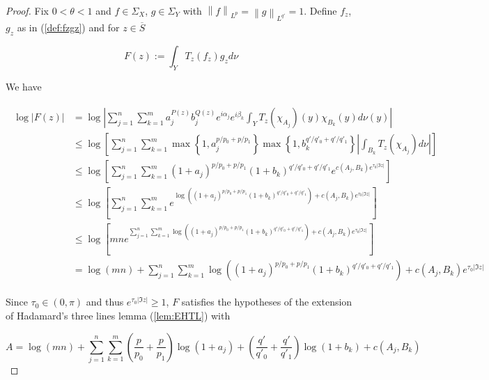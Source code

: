 \begin{proof}
	Fix $0 < \theta < 1$ and $f \in \Sigma_X$, $g \in \Sigma_Y$ with $\left\|f\right\|_{L^p} = \left\|g\right\|_{L^{q'}} = 1$. Define $f_z$, $g_z$ as in (\ref{def:fzgz}) and for $z \in \overline{S}$

	\begin{equation}
		F(z) := \int_Y T_z(f_z)g_z d\nu	
	\end{equation}

	We have

	\begin{gather*}
		\begin{aligned}
			\log \left| F(z) \right| &= \log \left| \sum_{j = 1}^n\sum_{k = 1}^m a^{P(z)}_j b_j^{Q(z)} e^{i\alpha_j} e^{i\beta_k} \int_YT_z(\chi_{A_j})(y)\chi_{B_k}(y)d\nu(y)\right|\\
			&\leqslant  \log \left[ \sum_{j = 1}^n\sum_{k = 1}^m \max\left\{1,a_j^{p/p_0 + p/p_1}\right\} \max\left\{1,b_k^{q'/q'_0 + q'/q'_1}\right\} \left|\int_{B_k} T_z(\chi_{A_j}) d\nu\right|\right]\\
		&\leqslant \log\left[ \sum_{j = 1}^n\sum_{k = 1}^m \left( 1 + a_j\right)^{p/p_0 + p/p_1} \left(1 + b_k\right)^{q'/q'_0 + q'/q'_1} e^{c(A_j,B_k)e^{\tau_0 \left| \Im z\right|}} \right]\\
	&\leqslant  \log\left[ \sum_{j = 1}^n\sum_{k = 1}^m e^{\log\left(\left( 1 + a_j\right)^{p/p_0 + p/p_1}\left( 1 + b_k\right)^{q'/q'_0 + q'/q'_1}\right) + c(A_j,B_k)e^{\tau_0 \left| \Im z\right|}} \right]\\
	&\leqslant \log\left[ mn e^{\sum_{j = 1}^n\sum_{k = 1}^m\log\left(\left( 1 + a_j\right)^{p/p_0 + p/p_1} \left(1 + b_k\right)^{q'/q'_0 + q'/q'_1}\right) + c(A_j,B_k)e^{\tau_0 \left| \Im z\right|}} \right]\\
			&= \log\left( mn \right) + \sum_{j = 1}^n\sum_{k = 1}^m\log\left(\left(1 + a_j\right)^{p/p_0 + p/p_1}\left(1 +  b_k\right)^{q'/q'_0 + q'/q'_1}\right) + c(A_j,B_k)e^{\tau_0 \left| \Im z\right|}
		\end{aligned}
	\end{gather*}

	Since $\tau_0 \in (0,\pi)$ and thus $e^{\tau_0 \left| \Im z\right|} \geqslant 1$, $F$ satisfies the hypotheses of the extension of Hadamard's three lines lemma (\ref{lem:EHTL}) with 

		\begin{equation*}
		A =  \log\left( mn \right) + \sum_{j = 1}^n\sum_{k = 1}^m\left( \frac{p}{p_0} + \frac{p}{p_1}\right)\log\left(1 + a_j\right) + \left( \frac{q'}{q'_0} + \frac{q'}{q'_1} \right) \log\left( 1 + b_k\right) + c(A_j,B_k)
	\end{equation*}


\end{proof}
